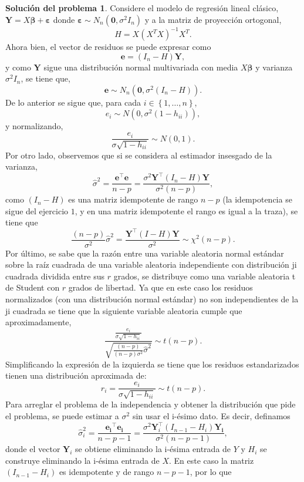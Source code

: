 \documentclass[twoside,12pt]{article}
\theoremstyle{definition}
\newtheorem{soln}{Solución del problema}
\begin{document}
\newpage
\begin{soln}
 Considere el modelo de regresión lineal clásico, $\boldsymbol{Y}=X\boldsymbol{\beta} + \boldsymbol{\varepsilon}$ donde $\boldsymbol{\varepsilon}\sim N_n(\boldsymbol{0},\sigma^2 I_n)$ y a la matriz de proyección ortogonal,
\[
H=X{(X^T X)}^{-1}X^T.
\]
Ahora bien, el vector de residuos se puede expresar como 
\[
\boldsymbol{e}=(I_n-H)\boldsymbol{Y},
\]
y como $\boldsymbol{Y}$ sigue una distribución normal multivariada con media $X\boldsymbol{\beta}$ y varianza $\sigma^2 I_n$, se tiene que, 
\[
\boldsymbol{e}\sim N_n\left(\mathbf{0}, \sigma^2\left(I_n-H\right)\right).
\]
De lo anterior se sigue que, para cada $i\in \left\lbrace 1, \ldots, n \right\rbrace$,
\[
e_i \sim N(0,\sigma^2 (1-h_{ii})),
\]
y normalizando,
\[
\frac{e_i}{\sigma\sqrt{1-h_{ii}}}\sim N(0,1).
\]
Por otro lado, observemos que si se considera al estimador insesgado de la varianza,
\[
\hat{\sigma}^2=\frac{\mathbf{e}^{\top} \mathbf{e}}{n-p}=\frac{\sigma^2 \mathbf{Y}^{\top}(I_n-H) \mathbf{Y}}{\sigma^2 (n-p)},
\]
como $(I_n-H)$ es una matriz idempotente de rango $n-p$ (la idempotencia se sigue del ejercicio $1$, y en una matriz idempotente el rango es igual a la traza), se tiene que 
\[
\frac{(n-p)}{\sigma^2}\hat{\sigma}^2= \frac{ \mathbf{Y}^{\top}(I-H) \mathbf{Y}}{\sigma^2} \sim \chi^2(n-p).
\]
Por último, se sabe que la razón entre una variable aleatoria normal estándar sobre la raíz cuadrada de una variable aleatoria independiente con distribución ji cuadrada dividida entre sus $r$ grados, se distribuye como una variable aleatoria t de Student con $r$ grados de libertad. Ya que en este caso los residuos normalizados (con una distribución  normal estándar) no son independientes de la ji cuadrada se tiene que la siguiente variable aleatoria cumple que aproximadamente,
\[
\frac{\frac{e_i}{\sigma\sqrt{1-h_{ii}}}}{\sqrt{\frac{(n-p)}{(n-p)\sigma^2}\hat{\sigma}^2}} \sim t(n-p).
\]
Simplificando la expresión de la izquierda se tiene que los residuos estandarizados tienen una distribución aproximada de:
\[
r_i=\frac{e_i}{\hat{\sigma} \sqrt{1-h_{i i}}} \sim t(n-p).
\]
Para arreglar el problema de la independencia y obtener la distribución que pide el problema, se puede estimar a $\sigma^2$ sin usar el i-ésimo dato. Es decir, definamos
\[
\hat{\sigma}_{i}^2=\frac{\mathbf{e_i}^{\top} \mathbf{e_i}}{n-p-1}=\frac{\sigma^2 \mathbf{Y}_i^{\top}(I_{n-1}-H_i) \mathbf{Y_i}}{\sigma^2 (n-p-1)},
\]
donde el vector $\mathbf{Y}_i$ se obtiene eliminando la i-ésima entrada de $Y$ y $H_i$ se construye eliminando la i-ésima entrada de $X$. En este caso la matriz $(I_{n-1}-H_i)$ es idempotente y de rango $n-p-1$, por lo que

\end{soln}
\end{document}
